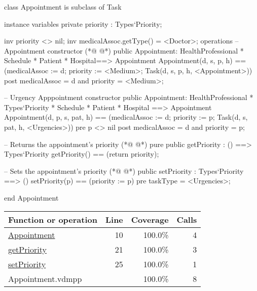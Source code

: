 \begin{vdmpp}[breaklines=true]
class Appointment is subclass of Task

instance variables
  private priority : Types`Priority;
  
  inv priority <> nil;
  inv medicalAssoc.getType() = <Doctor>;
operations
 -- Appointment constructor
(*@
\label{Appointment:10}
@*)
 public Appointment: HealthProfessional * Schedule * Patient * Hospital==> Appointment
  Appointment(d, s, p, h) == (medicalAssoc := d; priority := <Medium>; Task(d, s, p, h, <Appointment>))
 post medicalAssoc = d and priority = <Medium>;
 
 -- Urgency Apppointment constructor
 public Appointment: HealthProfessional * Types`Priority * Schedule * Patient * Hospital ==> Appointment
  Appointment(d, p, s, pat, h) == (medicalAssoc := d; priority := p; Task(d, s, pat, h, <Urgencies>))
 pre p <> nil
 post medicalAssoc = d and priority = p;

 -- Returns the appointment's priority
(*@
\label{getPriority:21}
@*)
 pure public getPriority : () ==> Types`Priority
  getPriority() == (return priority);

  -- Sets the appointment's priority
(*@
\label{setPriority:25}
@*)
  public setPriority : Types`Priority ==> ()
   setPriority(p) == (priority := p)
  pre taskType = <Urgencies>;
  
end Appointment
\end{vdmpp}
\bigskip
\begin{longtable}{|l|r|r|r|}
\hline
Function or operation & Line & Coverage & Calls \\
\hline
\hline
\hyperref[Appointment:10]{Appointment} & 10&100.0\% & 4 \\
\hline
\hyperref[getPriority:21]{getPriority} & 21&100.0\% & 3 \\
\hline
\hyperref[setPriority:25]{setPriority} & 25&100.0\% & 1 \\
\hline
\hline
Appointment.vdmpp & & 100.0\% & 8 \\
\hline
\end{longtable}

